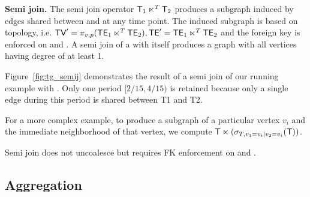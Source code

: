 
{\bf Semi join.}  The semi join operator $\mathsf{T}_1 \ltimes^T \mathsf{T}_2$
produces a subgraph induced by edges shared between  and
 at any time point.  The induced subgraph is based on
topology, i.e. $\textsf{TV}' = \pi_{v,p} ( \textsf{TE}_1 \ltimes^T \textsf{TE}_2), \textsf{TE}' =
\textsf{TE}_1 \ltimes^T \textsf{TE}_2$ and the foreign key is enforced on \tav and
\tae.  A semi join of a \ttt with itself produces a graph with all
vertices having degree of at least 1.

Figure~\ref{fig:tg_semij} demonstrates the result of a semi join of
our running example  with .  Only one period
$[2/15, 4/15)$ is retained because only a single edge during this
  period is shared between T1 and T2.

For a more complex example, to produce a subgraph of a particular
vertex $v_i$ and the immediate neighborhood of that vertex, we compute
$\mathsf{T} \ltimes (\sigma_{T,v_1=v_i | v_2=v_i} (\mathsf{T}))$.

Semi join does not uncoalesce but requires FK enforcement on \tav and
\tae.

\subsection{Aggregation}
\label{sec:algebra:agg}

